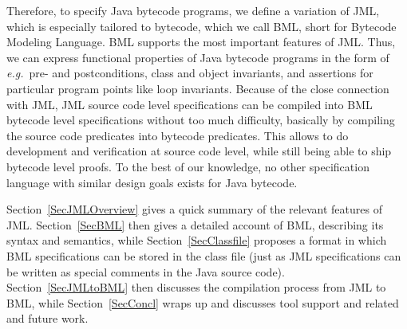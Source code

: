 Therefore, to specify Java bytecode programs, we define a variation of
JML, which is especially tailored to bytecode, which we call BML,
short for Bytecode Modeling Language.  BML supports the most important
features of JML. Thus, we can express functional properties of Java
bytecode programs in the form of \emph{e.g.}\ pre- and postconditions,
class and object invariants, and assertions for particular program
points like loop invariants. Because of the close connection with JML,
JML source code level specifications can be compiled into BML bytecode
level specifications without too much difficulty, basically by
compiling the source code predicates into bytecode predicates.  This
allows to do development and verification at source code level, while
still being able to ship bytecode level proofs.  To the best of our
knowledge, no other specification language with similar design goals
exists for Java bytecode.

Section~\ref{SecJMLOverview} gives a quick summary of the relevant
features of JML. Section~\ref{SecBML} then gives a detailed account of
BML, describing its syntax and semantics, while
Section~\ref{SecClassfile} proposes a format in which BML
specifications can be stored in the class file (just as JML
specifications can be written as special comments in the Java source
code). Section~\ref{SecJMLtoBML} then discusses the compilation
process from JML to BML, while Section~\ref{SecConcl} wraps up and
discusses tool support and related and future work.


